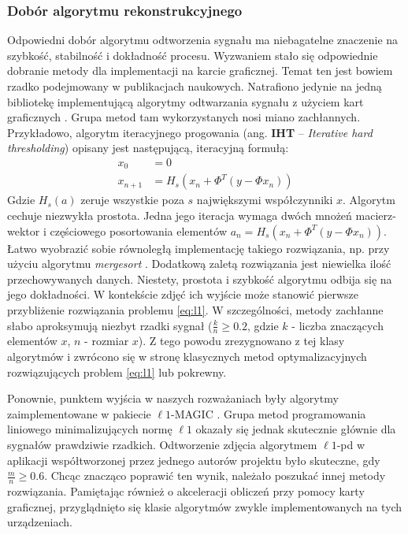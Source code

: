 \subsubsection{Dobór algorytmu rekonstrukcyjnego}
Odpowiedni dobór algorytmu odtworzenia sygnału ma niebagatelne znaczenie na szybkość, stabilność i dokładność procesu. Wyzwaniem stało się odpowiednie dobranie metody dla implementacji na karcie graficznej. Temat ten jest bowiem rzadko podejmowany w publikacjach naukowych. Natrafiono jedynie na jedną bibliotekę implementującą algorytmy odtwarzania sygnału z użyciem kart graficznych \cite{GAGA}. Grupa metod tam wykorzystanych nosi miano zachłannych. Przykładowo, algorytm iteracyjnego progowania (ang. \textbf{IHT} -- \textit{Iterative hard thresholding}) \cite{Blumensath2009} opisany jest następującą, iteracyjną formułą: 
\begin{equation}
\begin{split}
    x_0 & = 0 \\ 
x_{n+1} & = H_s \left(x_n + \Phi^T(y - \Phi x_n) \right)
\end{split}
\end{equation}
\newline{}
Gdzie $H_s(a)$ zeruje wszystkie poza $s$ największymi współczynniki $x$. Algorytm cechuje niezwykła prostota. Jedna jego iteracja wymaga dwóch mnożeń macierz-wektor i częściowego posortowania elementów $a_n =  H_s \left(x_n + \Phi^T(y - \Phi x_n) \right)$. Łatwo wyobrazić sobie równoległą implementację takiego rozwiązania, np. przy użyciu algorytmu \textit{mergesort} \cite{Thouti2012}. Dodatkową zaletą rozwiązania jest niewielka ilość przechowywanych danych. Niestety, prostota i szybkość algorytmu odbija się na jego dokładności. W kontekście zdjęć ich wyjście może stanowić pierwsze przybliżenie rozwiązania problemu \ref{eq:l1}. W szczególności, metody zachłanne słabo aproksymują niezbyt rzadki sygnał ($\frac{k}{n} \ge 0.2$, gdzie $k$ - liczba znaczących elementów $x$, $n$ - rozmiar $x$). Z tego powodu zrezygnowano z tej klasy algorytmów i zwrócono się w stronę klasycznych metod optymalizacyjnych rozwiązujących problem \ref{eq:l1} lub pokrewny.

Ponownie, punktem wyjścia w naszych rozważaniach były algorytmy zaimplementowane w pakiecie $\ell 1$-MAGIC \cite{SinglePixelCameraCode}. Grupa metod programowania liniowego minimalizujących normę $\ell 1$ okazały się jednak skutecznie głównie dla sygnałów prawdziwie rzadkich. Odtworzenie zdjęcia algorytmem $\ell 1$-pd \cite{Boyd2004} w aplikacji współtworzonej przez jednego autorów projektu \cite{PR12SIS306} było skuteczne, gdy $\frac{m}{n} \ge  0.6$. Chcąc znacząco poprawić ten wynik, należało poszukać innej metody rozwiązania. Pamiętając również o akceleracji obliczeń przy pomocy karty graficznej, przyglądnięto się klasie algorytmów zwykle implementowanych na tych urządzeniach. 

